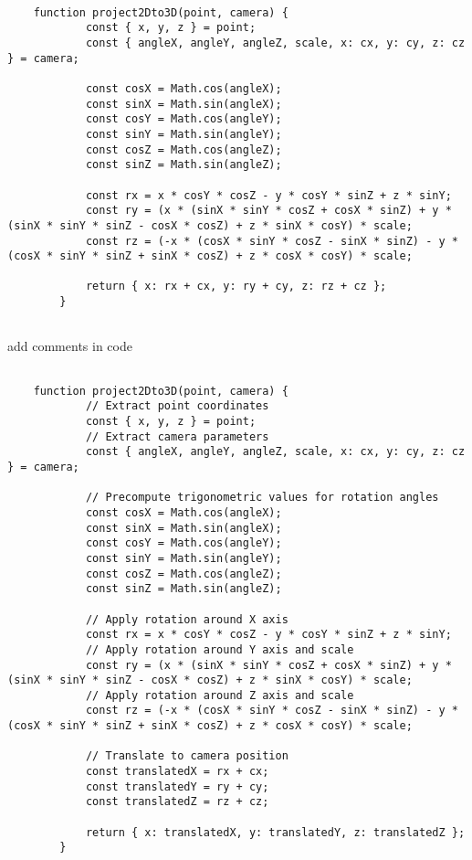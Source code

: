 \begin{lstlisting}[numbers=none]
	
	function project2Dto3D(point, camera) {
			const { x, y, z } = point;
			const { angleX, angleY, angleZ, scale, x: cx, y: cy, z: cz } = camera;

			const cosX = Math.cos(angleX);
			const sinX = Math.sin(angleX);
			const cosY = Math.cos(angleY);
			const sinY = Math.sin(angleY);
			const cosZ = Math.cos(angleZ);
			const sinZ = Math.sin(angleZ);

			const rx = x * cosY * cosZ - y * cosY * sinZ + z * sinY;
			const ry = (x * (sinX * sinY * cosZ + cosX * sinZ) + y * (sinX * sinY * sinZ - cosX * cosZ) + z * sinX * cosY) * scale;
			const rz = (-x * (cosX * sinY * cosZ - sinX * sinZ) - y * (cosX * sinY * sinZ + sinX * cosZ) + z * cosX * cosY) * scale;

			return { x: rx + cx, y: ry + cy, z: rz + cz };
		}
	
\end{lstlisting}


\begin{leftBox}
	add comments in code
\end{leftBox}

\begin{lstlisting}[numbers=none]
	
	function project2Dto3D(point, camera) {
			// Extract point coordinates
			const { x, y, z } = point;
			// Extract camera parameters
			const { angleX, angleY, angleZ, scale, x: cx, y: cy, z: cz } = camera;

			// Precompute trigonometric values for rotation angles
			const cosX = Math.cos(angleX);
			const sinX = Math.sin(angleX);
			const cosY = Math.cos(angleY);
			const sinY = Math.sin(angleY);
			const cosZ = Math.cos(angleZ);
			const sinZ = Math.sin(angleZ);

			// Apply rotation around X axis
			const rx = x * cosY * cosZ - y * cosY * sinZ + z * sinY;
			// Apply rotation around Y axis and scale
			const ry = (x * (sinX * sinY * cosZ + cosX * sinZ) + y * (sinX * sinY * sinZ - cosX * cosZ) + z * sinX * cosY) * scale;
			// Apply rotation around Z axis and scale
			const rz = (-x * (cosX * sinY * cosZ - sinX * sinZ) - y * (cosX * sinY * sinZ + sinX * cosZ) + z * cosX * cosY) * scale;

			// Translate to camera position
			const translatedX = rx + cx;
			const translatedY = ry + cy;
			const translatedZ = rz + cz;

			return { x: translatedX, y: translatedY, z: translatedZ };
		}
	
\end{lstlisting}

